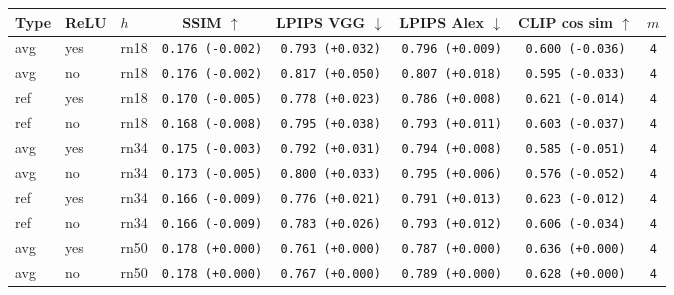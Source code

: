 \begin{tabular}{|l|l|l|c|c|c|c|c|}
\hline
Type & ReLU & $h$ & SSIM $\uparrow$ & LPIPS VGG $\downarrow$ & LPIPS Alex $\downarrow$ & CLIP cos sim $\uparrow$ & $m$ \\
\hline
avg & yes & rn18 & \texttt{0.176 {\color{red}(-0.002)}} & \texttt{0.793 {\color{red}(+0.032)}} & \texttt{0.796 {\color{red}(+0.009)}} & \texttt{0.600 {\color{red}(-0.036)}} & \texttt{4} \\
avg & no & rn18 & \texttt{0.176 {\color{red}(-0.002)}} & \texttt{0.817 {\color{red}(+0.050)}} & \texttt{0.807 {\color{red}(+0.018)}} & \texttt{0.595 {\color{red}(-0.033)}} & \texttt{4} \\
ref & yes & rn18 & \texttt{0.170 {\color{red}(-0.005)}} & \texttt{0.778 {\color{red}(+0.023)}} & \texttt{0.786 {\color{red}(+0.008)}} & \texttt{0.621 {\color{red}(-0.014)}} & \texttt{4} \\
ref & no & rn18 & \texttt{0.168 {\color{red}(-0.008)}} & \texttt{0.795 {\color{red}(+0.038)}} & \texttt{0.793 {\color{red}(+0.011)}} & \texttt{0.603 {\color{red}(-0.037)}} & \texttt{4} \\
\hline
avg & yes & rn34 & \texttt{0.175 {\color{red}(-0.003)}} & \texttt{0.792 {\color{red}(+0.031)}} & \texttt{0.794 {\color{red}(+0.008)}} & \texttt{0.585 {\color{red}(-0.051)}} & \texttt{4} \\
avg & no & rn34 & \texttt{0.173 {\color{red}(-0.005)}} & \texttt{0.800 {\color{red}(+0.033)}} & \texttt{0.795 {\color{red}(+0.006)}} & \texttt{0.576 {\color{red}(-0.052)}} & \texttt{4} \\
ref & yes & rn34 & \texttt{0.166 {\color{red}(-0.009)}} & \texttt{0.776 {\color{red}(+0.021)}} & \texttt{0.791 {\color{red}(+0.013)}} & \texttt{0.623 {\color{red}(-0.012)}} & \texttt{4} \\
ref & no & rn34 & \texttt{0.166 {\color{red}(-0.009)}} & \texttt{0.783 {\color{red}(+0.026)}} & \texttt{0.793 {\color{red}(+0.012)}} & \texttt{0.606 {\color{red}(-0.034)}} & \texttt{4} \\
\hline
\rowcolor{verylightgray}avg & yes & rn50 & \texttt{0.178 {\color{black}(+0.000)}} & \texttt{0.761 {\color{black}(+0.000)}} & \texttt{0.787 {\color{black}(+0.000)}} & \texttt{0.636 {\color{black}(+0.000)}} & \texttt{4} \\
\rowcolor{verylightgray}avg & no & rn50 & \texttt{0.178 {\color{black}(+0.000)}} & \texttt{0.767 {\color{black}(+0.000)}} & \texttt{0.789 {\color{black}(+0.000)}} & \texttt{0.628 {\color{black}(+0.000)}} & \texttt{4} \\

\end{tabular}
